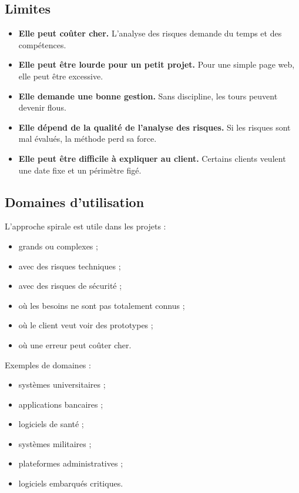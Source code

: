 \documentclass[12pt,a4paper]{article}
\begin{document}
\subsection{Limites}

\begin{itemize}
    \item \textbf{Elle peut coûter cher.} L'analyse des risques demande du temps et des compétences.
    \item \textbf{Elle peut être lourde pour un petit projet.} Pour une simple page web, elle peut être excessive.
    \item \textbf{Elle demande une bonne gestion.} Sans discipline, les tours peuvent devenir flous.
    \item \textbf{Elle dépend de la qualité de l'analyse des risques.} Si les risques sont mal évalués, la méthode perd sa force.
    \item \textbf{Elle peut être difficile à expliquer au client.} Certains clients veulent une date fixe et un périmètre figé.
\end{itemize}

\subsection{Domaines d'utilisation}

L'approche spirale est utile dans les projets :

\begin{itemize}
    \item grands ou complexes ;
    \item avec des risques techniques ;
    \item avec des risques de sécurité ;
    \item où les besoins ne sont pas totalement connus ;
    \item où le client veut voir des prototypes ;
    \item où une erreur peut coûter cher.
\end{itemize}

Exemples de domaines :

\begin{itemize}
    \item systèmes universitaires ;
    \item applications bancaires ;
    \item logiciels de santé ;
    \item systèmes militaires ;
    \item plateformes administratives ;
    \item logiciels embarqués critiques.
\end{itemize}
\end{document}
